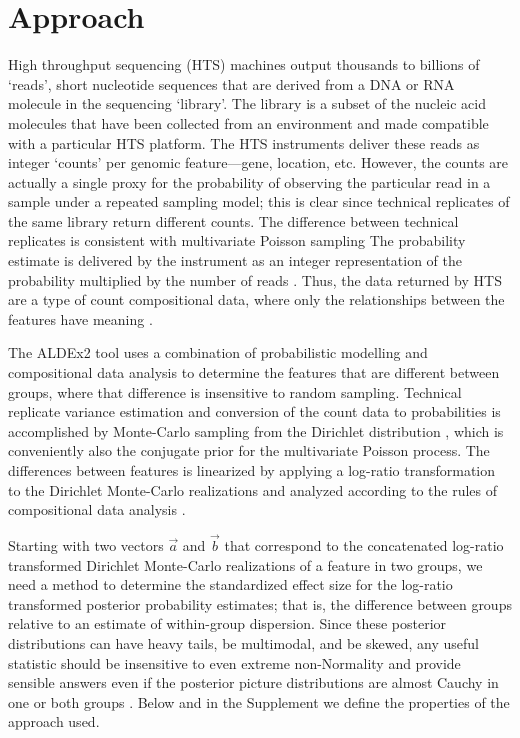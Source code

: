 \documentclass{bioinfo}
\begin{document}
\section{Approach}

High throughput sequencing (HTS) machines output thousands to billions of `reads', short nucleotide sequences that are derived from a DNA or RNA molecule in the sequencing `library'. The library is a subset of the nucleic acid molecules that have been collected from an environment and made compatible with a particular HTS platform. The HTS instruments deliver these reads as integer `counts' per genomic feature---gene, location, etc. However, the counts are actually a single proxy for the probability of observing the particular read in a sample under a repeated sampling model; this is clear since technical replicates of the same library return different counts. The difference between technical replicates is consistent with multivariate Poisson sampling \citep{fernandes:2013, gloorAJS:2016} The probability estimate is delivered by the instrument as an integer representation of the probability multiplied by the number of reads  \citep{fernandes:2013, gloorAJS:2016}. Thus, the data returned by HTS are a type of count compositional data, where only the relationships between the features have meaning \citep{aitchison:1986, Lovell:2015,fernandes:2014,gloorFrontiers:2017,Kaul:2017aa}. 

The ALDEx2 tool uses a combination of probabilistic modelling and compositional data analysis to determine the features that are different between groups, where that difference is insensitive to random sampling. Technical replicate variance estimation and conversion of the count data to probabilities is accomplished by Monte-Carlo sampling from the Dirichlet distribution \citep{fernandes:2013, gloorAJS:2016}, which is conveniently also the conjugate prior for the multivariate Poisson process. The differences between features is linearized by applying a log-ratio transformation to the Dirichlet Monte-Carlo realizations and analyzed according to the rules of compositional data analysis \citep{aitchison:1986,fernandes:2013,Tsilimigras:2016aa,gloorFrontiers:2017}.
	
Starting with two vectors $\vec{a}$ and $\vec{b}$  that correspond to the concatenated log-ratio transformed Dirichlet Monte-Carlo realizations of a feature in two groups, we need a method to determine the standardized effect size  for the log-ratio transformed posterior probability estimates;  that is, the difference between groups relative to an estimate of within-group dispersion. Since these posterior distributions can have heavy tails, be multimodal, and be skewed, any useful statistic should be insensitive to even extreme non-Normality and provide sensible answers even if the posterior picture distributions are almost Cauchy in one or both groups \citep{fernandes:2013}. Below and in the Supplement we define the properties of the approach used. 
\end{document}

